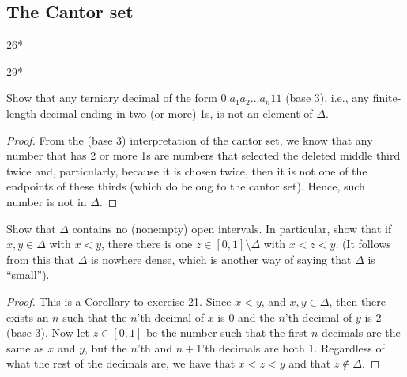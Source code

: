 \subsection{The Cantor set}

26*

29*

\begin{exercise}{21}
Show that any terniary decimal of the form $0.a_1a_2\dots a_n11$ (base 3), i.e., any finite-length decimal ending in two (or more) 1s, is not an element of $\Delta$.
\end{exercise}
\begin{proof}
From the (base 3) interpretation of the cantor set, we know that any number that has 2 or more 1s are numbers that selected the deleted middle third twice and, particularly, because it is chosen twice, then it is not one of the endpoints of these thirds (which do belong to the cantor set). Hence, such number is not in $\Delta$.
\end{proof} 

\begin{exercise}{22}
Show that $\Delta$ contains no (nonempty) open intervals. In particular, show that if $x,y\in\Delta$ with $x<y$, there there is one $z\in[0,1]\setminus\Delta$ with $x<z<y$. (It follows from this that $\Delta$ is nowhere dense, which is another way of saying that $\Delta$ is ``small'').
\end{exercise}
\begin{proof}
This is a Corollary to exercise 21. Since $x<y$, and $x,y\in\Delta$, then there exists an $n$ such that the $n$'th decimal of $x$ is 0 and the $n$'th decimal of $y$ is 2 (base 3). Now let $z\in[0,1]$ be the number such that the first $n$ decimals are the same as $x$ and $y$, but the $n$'th and $n+1$'th decimals are both 1. Regardless of what the rest of the decimals are, we have that $x<z<y$ and that $z\notin\Delta$.
\end{proof} 

